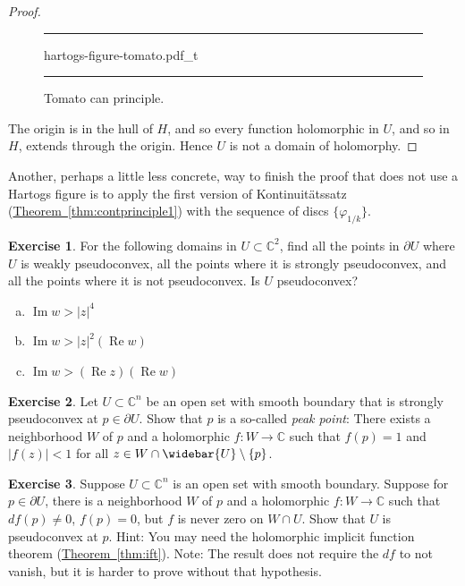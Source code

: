 \documentclass[12pt,openany]{book}
\renewcommand{\Re}{\operatorname{Re}}
\renewcommand{\Im}{\operatorname{Im}}
\newcommand{\sabs}[1]{\lvert {#1} \rvert}
\newcommand{\C}{{\mathbb{C}}}
\newcommand{\myindex}[1]{#1\index{#1}}
\theoremstyle{plain}
\theoremstyle{remark}
\theoremstyle{definition}
\newenvironment{exbox}{%
    \def\FrameCommand{\vrule width 1pt \relax\hspace{10pt}}%
    \MakeFramed{\advance\hsize-\width\FrameRestore}%
}{%
    \endMakeFramed
}
\newenvironment{exparts}{%
    \leavevmode\begin{enumerate}[a),noitemsep,topsep=0pt,parsep=0pt,partopsep=0pt]
}{%
    \end{enumerate}
}
\newenvironment{myfig}{%
\begin{figure}[h!t]
\noindent\rule{\textwidth}{0.5pt}\vspace{12pt}\par\centering}%
{\par\noindent\rule{\textwidth}{0.5pt}
\end{figure}}
\theoremstyle{exercise}
\newtheorem{exercise}{Exercise}[section]
\theoremstyle{example}
\newcommand{\thmref}[1]{\hyperref[#1]{Theorem~\ref*{#1}}}
\begin{document}
\begin{proof}
\begin{myfig}
{hartogs-figure-tomato.pdf_t}
\caption{Tomato can principle.\label{fig:hartogs-figure-tomato}}
\end{myfig}

The origin is in the hull of $H$, and so
every function holomorphic in $U$, and so in $H$, extends through the origin.
Hence $U$ is not a domain of holomorphy.
\end{proof}

Another, perhaps a little less concrete, way to finish the proof that does not use a Hartogs figure
is to apply the first version of Kontinuit\"atssatz
(\thmref{thm:contprinciple1}) with the sequence of discs $\{ \varphi_{1/k} \}$.

\begin{exbox}
\begin{exercise}
\pagebreak[2]
For the following domains in $U \subset \C^2$,
find all the
points in $\partial U$ where $U$ is weakly pseudoconvex, all the points
where it is strongly pseudoconvex, and all the points where it is
not pseudoconvex.  Is $U$ pseudoconvex?
\begin{exparts}
\item
$\Im w > \sabs{z}^4$
\item
$\Im w > \sabs{z}^2(\Re w)$
\item
$\Im w > (\Re z)(\Re w)$
\end{exparts}
\end{exercise}

\begin{exercise}
\pagebreak[2]
Let $U \subset \C^n$ be an open set with smooth boundary that is
strongly pseudoconvex at $p \in \partial U$.  Show that
$p$ is a so-called \emph{\myindex{peak point}}: There
exists a neighborhood $W$ of $p$ and a holomorphic
$f \colon W \to \C$ such that $f(p)=1$ and $\sabs{f(z)} < 1$ for all
$z \in W \cap \widebar{U} \setminus \{ p \}$.
\end{exercise}

\begin{exercise}
Suppose $U \subset \C^n$ is an open set with smooth boundary.  Suppose
for $p \in \partial U$, there is a neighborhood $W$ of $p$
and a holomorphic $f \colon W \to
\C$ such that $df(p) \not= 0$, $f(p) = 0$, but
$f$ is never zero on $W \cap U$.  Show that $U$ is pseudoconvex
at $p$.  Hint: You may need the holomorphic implicit function theorem
(\thmref{thm:ift}).
Note: The result does not require the $df$ to not vanish, but it is
harder to prove without that hypothesis.
\end{exercise}
\end{exbox}
\end{document}
